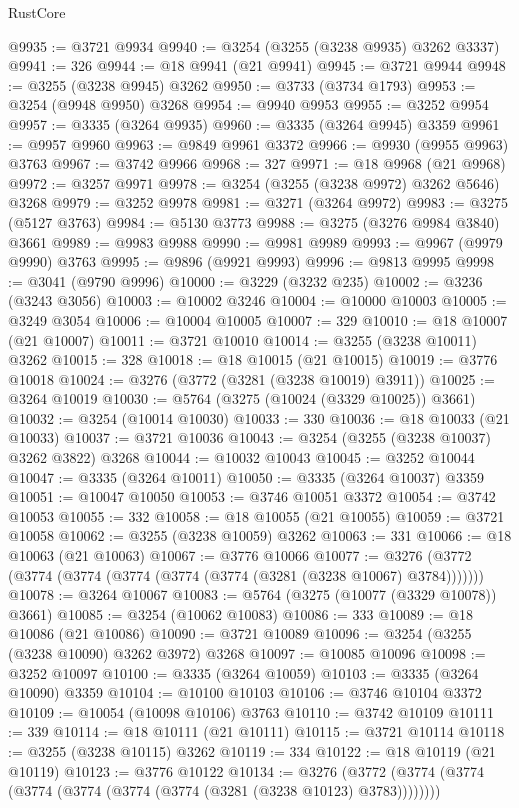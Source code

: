 \begin{lexlean}{RustCore}
\begin{coremodule}
@9935 := @3721 @9934
@9940 := @3254 (@3255 (@3238 @9935) @3262 @3337)
@9941 := 326
@9944 := @18 @9941 (@21 @9941)
@9945 := @3721 @9944
@9948 := @3255 (@3238 @9945) @3262
@9950 := @3733 (@3734 @1793)
@9953 := @3254 (@9948 @9950) @3268
@9954 := @9940 @9953
@9955 := @3252 @9954
@9957 := @3335 (@3264 @9935)
@9960 := @3335 (@3264 @9945) @3359
@9961 := @9957 @9960
@9963 := @9849 @9961 @3372
@9966 := @9930 (@9955 @9963) @3763
@9967 := @3742 @9966
@9968 := 327
@9971 := @18 @9968 (@21 @9968)
@9972 := @3257 @9971
@9978 := @3254 (@3255 (@3238 @9972) @3262 @5646) @3268
@9979 := @3252 @9978
@9981 := @3271 (@3264 @9972)
@9983 := @3275 (@5127 @3763)
@9984 := @5130 @3773
@9988 := @3275 (@3276 @9984 @3840) @3661
@9989 := @9983 @9988
@9990 := @9981 @9989
@9993 := @9967 (@9979 @9990) @3763
@9995 := @9896 (@9921 @9993)
@9996 := @9813 @9995
@9998 := @3041 (@9790 @9996)
@10000 := @3229 (@3232 @235)
@10002 := @3236 (@3243 @3056)
@10003 := @10002 @3246
@10004 := @10000 @10003
@10005 := @3249 @3054
@10006 := @10004 @10005
@10007 := 329
@10010 := @18 @10007 (@21 @10007)
@10011 := @3721 @10010
@10014 := @3255 (@3238 @10011) @3262
@10015 := 328
@10018 := @18 @10015 (@21 @10015)
@10019 := @3776 @10018
@10024 := @3276 (@3772 (@3281 (@3238 @10019) @3911))
@10025 := @3264 @10019
@10030 := @5764 (@3275 (@10024 (@3329 @10025)) @3661)
@10032 := @3254 (@10014 @10030)
@10033 := 330
@10036 := @18 @10033 (@21 @10033)
@10037 := @3721 @10036
@10043 := @3254 (@3255 (@3238 @10037) @3262 @3822) @3268
@10044 := @10032 @10043
@10045 := @3252 @10044
@10047 := @3335 (@3264 @10011)
@10050 := @3335 (@3264 @10037) @3359
@10051 := @10047 @10050
@10053 := @3746 @10051 @3372
@10054 := @3742 @10053
@10055 := 332
@10058 := @18 @10055 (@21 @10055)
@10059 := @3721 @10058
@10062 := @3255 (@3238 @10059) @3262
@10063 := 331
@10066 := @18 @10063 (@21 @10063)
@10067 := @3776 @10066
@10077 := @3276 (@3772 (@3774 (@3774 (@3774 (@3774 (@3774 (@3281 (@3238 @10067) @3784)))))))
@10078 := @3264 @10067
@10083 := @5764 (@3275 (@10077 (@3329 @10078)) @3661)
@10085 := @3254 (@10062 @10083)
@10086 := 333
@10089 := @18 @10086 (@21 @10086)
@10090 := @3721 @10089
@10096 := @3254 (@3255 (@3238 @10090) @3262 @3972) @3268
@10097 := @10085 @10096
@10098 := @3252 @10097
@10100 := @3335 (@3264 @10059)
@10103 := @3335 (@3264 @10090) @3359
@10104 := @10100 @10103
@10106 := @3746 @10104 @3372
@10109 := @10054 (@10098 @10106) @3763
@10110 := @3742 @10109
@10111 := 339
@10114 := @18 @10111 (@21 @10111)
@10115 := @3721 @10114
@10118 := @3255 (@3238 @10115) @3262
@10119 := 334
@10122 := @18 @10119 (@21 @10119)
@10123 := @3776 @10122
@10134 := @3276 (@3772 (@3774 (@3774 (@3774 (@3774 (@3774 (@3774 (@3281 (@3238 @10123) @3783))))))))

\end{coremodule}
\end{lexlean}
